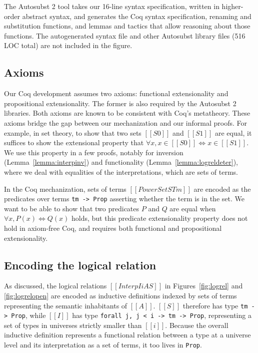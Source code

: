 \documentclass[\ifpublic nolinenum\else\fi,online,OA]{jfp}
\theoremstyle{definition}
\begin{document}
The Autosubst 2 tool takes our 16-line syntax specification, written in
higher-order abstract syntax, and generates the Coq syntax specification,
renaming and substitution functions, and lemmas and tactics that allow
reasoning about those functions. The autogenerated syntax file and other
Autosubst library files (516 LOC total) are not included in the figure.

\subsection{Axioms}

Our Coq development assumes two axioms: functional extensionality
and propositional extensionality. The former is also required by
the Autosubst 2 libraries. Both axioms are known to be consistent
with Coq's metatheory.
%
These axioms bridge the gap between our mechanization and our informal
proofs. For example, in set theory, to show that two sets $[[S0]]$ and
$[[S1]]$ are equal, it suffices to show the extensional property that
$\forall x, x \in [[S0]] \iff x \in [[S1]]$. We use this property in a few
proofs, notably for inversion (Lemma~\ref{lemma:interpinv}) and functionality
(Lemma~\ref{lemma:logreldeter}), where we deal with equalities of
the interpretations, which are sets of terms.

In the Coq mechanization, sets of terms $[[PowerSet STm]]$ are encoded as the
predicates over terms \texttt{tm -> Prop} asserting whether the term is in the
set. We want to be able to show that two predicates $P$ and $Q$ are equal when
$\forall x, P(x) \iff Q(x)$ holds, but this predicate extensionality property
does not hold in axiom-free Coq, and requires both functional and propositional
extensionality.

\subsection{Encoding the logical relation}

As discussed, the logical relations $[[Interp I i A S]]$ in
Figures~\ref{fig:logrel} and \ref{fig:logrelopen} are encoded as inductive
definitions indexed by sets of terms representing the semantic inhabitants of
$[[A]]$. $[[S]]$ therefore has type \texttt{tm -> Prop}, while $[[I]]$ has type
\texttt{forall j, j < i -> tm -> Prop}, representing a set of types in
universes strictly smaller than $[[i]]$. Because the overall inductive
definition represents a functional relation between a type at a universe level
and its interpretation as a set of terms, it too lives in \texttt{Prop}.
\end{document}
